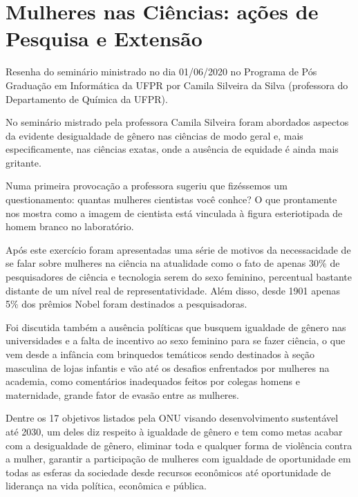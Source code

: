\documentclass[
	12pt,				%
	openright,			%
	twoside,			%
	a4paper,			%
	english,			%
	brazil,				%
	svgnames
	]{abntex2}\usepackage[]{graphicx}\usepackage[]{color}
\begin{document}
\chapter{Mulheres nas Ciências: ações de Pesquisa e Extensão}
\label{cap:res4}


Resenha do seminário ministrado no dia 01/06/2020 no Programa de Pós Graduação em Informática da UFPR por Camila Silveira da Silva (professora do Departamento de Química da UFPR).

No seminário mistrado pela professora Camila Silveira foram abordados aspectos da evidente desigualdade de gênero nas ciências de modo geral e, mais especificamente, nas ciências exatas, onde a ausência de equidade é ainda mais gritante.

Numa primeira provocação a professora sugeriu que fizéssemos um questionamento: quantas mulheres cientistas você conhce? O que prontamente nos mostra como a imagem de cientista está vinculada à figura esteriotipada de homem branco no laboratório.

Após este exercício foram apresentadas uma série de motivos da necessacidade de se falar sobre mulheres na ciência na atualidade como o fato de apenas 30\% de pesquisadores de ciência e tecnologia serem do sexo feminino, percentual bastante distante de um nível real de representatividade. Além disso, desde 1901 apenas 5\% dos prêmios Nobel foram destinados a pesquisadoras.

Foi discutida também a ausência políticas que busquem igualdade de gênero nas universidades e a falta de incentivo ao sexo feminino para se fazer ciência, o que vem desde a infância com brinquedos temáticos sendo destinados à seção masculina de lojas infantis e vão até os desafios enfrentados por mulheres na academia, como comentários inadequados feitos por colegas homens e maternidade, grande fator de evasão entre as mulheres.

Dentre os 17 objetivos listados pela ONU visando desenvolvimento sustentável até 2030, um deles diz respeito à igualdade de gênero e tem como metas acabar com a desigualdade de gênero, eliminar toda e qualquer forma de violência contra a mulher, garantir a participação de mulheres com igualdade de oportunidade em todas as esferas da sociedade desde recursos econômicos até oportunidade de liderança na vida política, econômica e pública.
\end{document}
